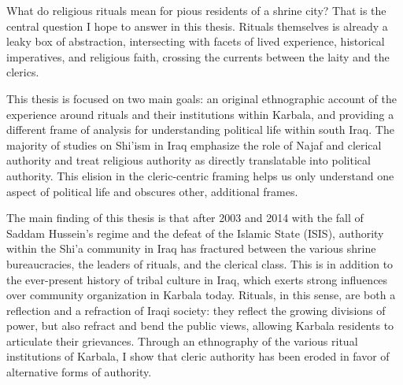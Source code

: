 
What do religious rituals mean for pious residents of a shrine city? That is the central question I hope to answer in this thesis. Rituals themselves is already a leaky box of abstraction, intersecting with facets of lived experience, historical imperatives, and religious faith, crossing the currents between the laity and the clerics.  


This thesis is focused on two main goals: an original ethnographic account of the experience around rituals and their institutions within Karbala, and providing a different frame of analysis for understanding political life within south Iraq. The majority of studies on Shi'ism in Iraq emphasize the role of Najaf and clerical authority and treat religious authority as directly translatable into political authority. This elision in the cleric-centric framing helps us only understand one aspect of political life and obscures other, additional frames. 

The main finding of this thesis is that after 2003 and 2014 with the fall of Saddam Hussein's regime and the defeat of the Islamic State (ISIS), authority within the Shi'a community in Iraq has fractured between the various shrine  bureaucracies, the leaders of rituals, and the clerical class. This is in addition to the ever-present history of tribal culture in Iraq, which exerts strong influences over community organization in Karbala today. Rituals, in this sense, are both a reflection and a refraction of Iraqi society: they reflect the growing divisions of power, but also refract and bend the public views, allowing Karbala residents to articulate their grievances. Through an ethnography of the various ritual institutions of Karbala, I show that cleric authority has been eroded in favor of alternative forms of authority. 

